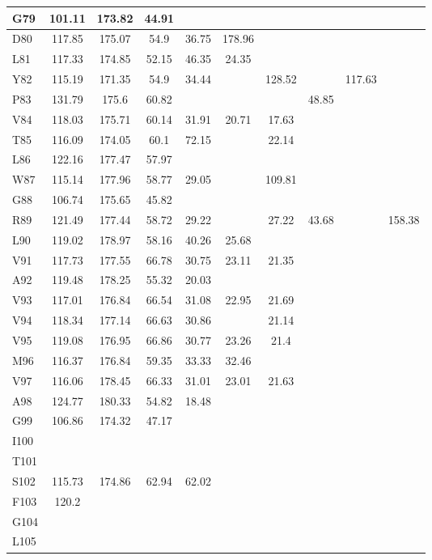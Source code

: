 \documentclass[%
 aip,
 amsmath,amssymb,
 preprint,%
]{revtex4-1}
\begin{document}
\begin{center}
\begin{longtable}{l|c|c|c|c|c|c|c|c|c}
G79 & 101.11 & 173.82 & 44.91 & & & & & & \\ \hline
D80 & 117.85 & 175.07 & 54.9 & 36.75 & 178.96 & & & & \\\hline
L81 & 117.33 & 174.85 & 52.15 & 46.35 & 24.35 & & & & \\\hline
Y82 & 115.19 & 171.35 & 54.9 & 34.44 & & 128.52 & & 117.63 & \\\hline
P83 & 131.79 & 175.6 & 60.82 & & & & 48.85 & & \\\hline
V84 & 118.03 & 175.71 & 60.14 & 31.91 & 20.71 & 17.63 & & & \\\hline
T85 & 116.09 & 174.05 & 60.1 & 72.15 & & 22.14 & & & \\\hline
L86 & 122.16 & 177.47 & 57.97 & & & & & & \\\hline
W87 & 115.14 & 177.96 & 58.77 & 29.05 & & 109.81 & & & \\\hline
G88 & 106.74 & 175.65 & 45.82 & & & & & & \\\hline
R89 & 121.49 & 177.44 & 58.72 & 29.22 & & 27.22 & 43.68 & & 158.38 \\\hline
L90 & 119.02 & 178.97 & 58.16 & 40.26 & 25.68 & & & & \\\hline
V91 & 117.73 & 177.55 & 66.78 & 30.75 & 23.11 & 21.35 & & & \\\hline
A92 & 119.48 & 178.25 & 55.32 & 20.03 & & & & & \\\hline
V93 & 117.01 & 176.84 & 66.54 & 31.08 & 22.95 & 21.69 & & & \\\hline
V94 & 118.34 & 177.14 & 66.63 & 30.86 & & 21.14 & & & \\\hline
V95 & 119.08 & 176.95 & 66.86 & 30.77 & 23.26 & 21.4 & & & \\\hline
M96 & 116.37 & 176.84 & 59.35 & 33.33 & 32.46 & & & & \\\hline
V97 & 116.06 & 178.45 & 66.33 & 31.01 & 23.01 & 21.63 & & & \\\hline
A98 & 124.77 & 180.33 & 54.82 & 18.48 & & & & & \\\hline
G99 & 106.86 & 174.32 & 47.17 & & & & & & \\\hline
I100 & & & & & & & & & \\\hline
T101 & & & & & & & & & \\\hline
S102 & 115.73 & 174.86 & 62.94 & 62.02 & & & & & \\\hline
F103 & 120.2 & & & & & & & & \\\hline
G104 & & & & & & & & & \\\hline
L105 & & & & & & & & & \\\hline

\end{longtable}
\end{center}
\end{document}
